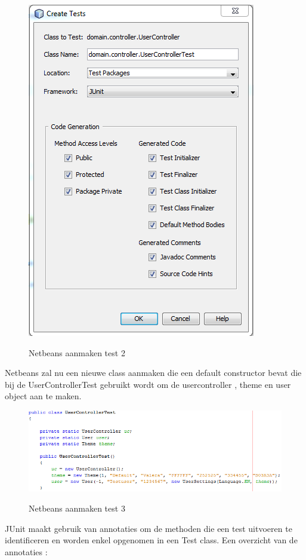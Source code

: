 \documentclass[pdftex,a4paper,12pt,twoside]{report}
\begin{document}
\begin{figure}[!htb]
\includegraphics{images/netbeansjunit2.png}\\
\caption{Netbeans aanmaken test 2}
\end{figure}

Netbeans zal nu een nieuwe class aanmaken die een default constructor bevat die bij de UserControllerTest gebruikt wordt om de usercontroller , theme en user object aan te maken.

\begin{figure}[!htb]
\includegraphics{images/junit1.png}\\
\caption{Netbeans aanmaken test 3}
\end{figure}

JUnit maakt gebruik van annotaties om de methoden die een test uitvoeren te identificeren en worden enkel opgenomen in een Test class. 
Een overzicht van de annotaties :
\end{document}
